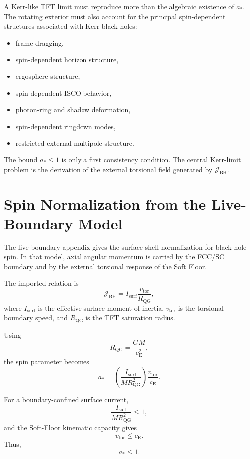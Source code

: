 A Kerr-like TFT limit must reproduce more than the algebraic existence of $a_\ast$. The rotating exterior must also account for the principal spin-dependent structures associated with Kerr black holes:
\begin{itemize}
    \item frame dragging,
    \item spin-dependent horizon structure,
    \item ergosphere structure,
    \item spin-dependent ISCO behavior,
    \item photon-ring and shadow deformation,
    \item spin-dependent ringdown modes,
    \item restricted external multipole structure.
\end{itemize}

The bound $a_\ast \leq 1$ is only a first consistency condition. The central Kerr-limit problem is the derivation of the external torsional field generated by $\mathcal{J}_{\mathrm{BH}}$.

\section{Spin Normalization from the Live-Boundary Model}
The live-boundary appendix gives the surface-shell normalization for black-hole spin. In that model, axial angular momentum is carried by the FCC/SC boundary and by the external torsional response of the Soft Floor.

The imported relation is
\begin{equation}
    \mathcal{J}_{\mathrm{BH}} = I_{\mathrm{surf}} \frac{v_{\mathrm{tor}}}{R_{\mathrm{QG}}},
\end{equation}
where $I_{\mathrm{surf}}$ is the effective surface moment of inertia, $v_{\mathrm{tor}}$ is the torsional boundary speed, and $R_{\mathrm{QG}}$ is the TFT saturation radius.

Using
\begin{equation}
    R_{\mathrm{QG}} = \frac{GM}{c_{\mathrm{E}}^2},
\end{equation}
the spin parameter becomes
\begin{equation}
    a_\ast = \left( \frac{I_{\mathrm{surf}}}{M R_{\mathrm{QG}}^2} \right) \frac{v_{\mathrm{tor}}}{c_{\mathrm{E}}}.
\end{equation}

For a boundary-confined surface current,
\begin{equation}
    \frac{I_{\mathrm{surf}}}{M R_{\mathrm{QG}}^2} \leq 1,
\end{equation}
and the Soft-Floor kinematic capacity gives
\begin{equation}
    v_{\mathrm{tor}} \leq c_{\mathrm{E}}.
\end{equation}
Thus,
\begin{equation}
    a_\ast \leq 1.
\end{equation}

